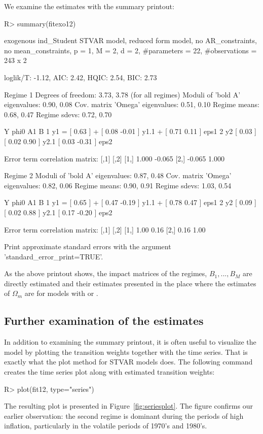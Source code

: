 \documentclass[nojss]{jss}
\begin{document}
We examine the estimates with the summary printout:
\begin{CodeChunk}
\begin{CodeInput}
R> summary(fitexo12)
\end{CodeInput}
\begin{CodeOutput}
exogenous ind_Student STVAR model, reduced form model, no AR_constraints,
no mean_constraints,
  p = 1, M = 2, d = 2, #parameters = 22, #observations = 243 x 2

loglik/T: -1.12, AIC: 2.42, HQIC: 2.54, BIC: 2.73

Regime 1
Degrees of freedom: 3.73, 3.78 (for all regimes)
Moduli of 'bold A' eigenvalues:  0.90, 0.08
Cov. matrix 'Omega' eigenvalues: 0.51, 0.10
Regime means: 0.68, 0.47
Regime sdevs: 0.72, 0.70

   Y     phi0          A1                      B
1 y1 = [ 0.63 ] + [  0.08 -0.01 ] y1.1 + [  0.71  0.11 ] eps1
2 y2   [ 0.03 ]   [  0.02  0.90 ] y2.1   [  0.03 -0.31 ] eps2

Error term correlation matrix:
       [,1]   [,2]
[1,]  1.000 -0.065
[2,] -0.065  1.000

Regime 2
Moduli of 'bold A' eigenvalues:  0.87, 0.48
Cov. matrix 'Omega' eigenvalues: 0.82, 0.06
Regime means: 0.90, 0.91
Regime sdevs: 1.03, 0.54

   Y     phi0          A1                      B
1 y1 = [ 0.65 ] + [  0.47 -0.19 ] y1.1 + [  0.78  0.47 ] eps1
2 y2   [ 0.09 ]   [  0.02  0.88 ] y2.1   [  0.17 -0.20 ] eps2

Error term correlation matrix:
     [,1] [,2]
[1,] 1.00 0.16
[2,] 0.16 1.00

Print approximate standard errors with the argument 'standard_error_print=TRUE'.
\end{CodeOutput}
\end{CodeChunk}
As the above printout shows, the impact matrices of the regimes, $B_1,...,B_M$ are directly estimated and their estimates presented in the place where the estimates of $\Omega_m$ are for models with  or .

\subsection{Further examination of the estimates}\label{sec:examestim}

In addition to examining the summary printout, it is often useful to visualize the model by plotting the transition weights together with the time series. That is exactly what the plot method for STVAR models does. The following command creates the time series plot along with estimated transition weights:
%
\begin{CodeChunk}
\begin{CodeInput}
R> plot(fit12, type="series")
\end{CodeInput}
\end{CodeChunk}
%
The resulting plot is presented in Figure~\ref{fig:seriesplot}. The figure confirms our earlier observation: the second regime is dominant during the periods of high inflation, particularly in the volatile periods of 1970's and 1980's.
\end{document}
